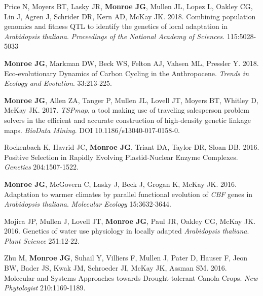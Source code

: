 \documentclass[12pt,english]{article}
\begin{document}
\begin{hangparas}{.5in}{1}
\vspace{1ex}\par
\hspace{1em}  Price N, Moyers BT, Lasky JR, \textbf{Monroe JG}, Mullen JL, Lopez L, Oakley CG, Lin J, Agren J, Schrider DR, Kern AD, McKay JK. 2018. Combining population genomics and fitness QTL to identify the genetics of local adaptation in \textit{Arabidopsis thaliana}. \textit{Proceedings of the National Academy of Sciences}. 115:5028-5033
\vspace{1ex}\par
\hspace{1em}  \textbf{Monroe JG}, Markman DW, Beck WS, Felton AJ, Vahsen ML, Pressler Y. 2018. Eco-evolutionary Dynamics of Carbon Cycling in the Anthropocene. \textit{Trends in Ecology and Evolution}. 33:213-225.
\vspace{1ex}\par
\hspace{1em}  \textbf{Monroe JG}, Allen ZA, Tanger P, Mullen JL, Lovell JT, Moyers BT, Whitley D, McKay JK. 2017. \textit{TSPmap}, a tool making use of traveling salesperson problem solvers in the efficient and accurate construction of high-density genetic linkage maps. \textit{BioData Mining}. DOI 10.1186/s13040-017-0158-0.
\vspace{1ex}\par
\hspace{1em} Rockenbach K, Havrid JC, \textbf{Monroe JG}, Triant DA, Taylor DR, Sloan DB. 2016. Positive Selection in Rapidly Evolving Plastid-Nuclear Enzyme Complexes. \textit{Genetics} 204:1507-1522.
\vspace{1ex}\par
\hspace{1em} \textbf{Monroe JG}, McGovern C, Lasky J, Beck J, Grogan K, McKay JK. 2016. Adaptation to warmer climates by parallel functional evolution of \textit{CBF} genes in \textit{Arabidopsis thaliana}. \textit{Molecular Ecology} 15:3632-3644.
\vspace{1ex}\par
\hspace{1em} Mojica JP, Mullen J, Lovell JT, \textbf{Monroe JG}, Paul JR, Oakley CG, McKay JK. 2016. Genetics of water use physiology in locally adapted \textit{Arabidopsis thaliana}. \textit{Plant Science}  251:12-22.
\vspace{1ex}\par
\hspace{1em} Zhu M, \textbf{Monroe JG}, Suhail Y, Villiers F, Mullen J, Pater D, Hauser F, Jeon BW, Bader JS, Kwak JM, Schroeder JI, McKay JK, Assman SM. 2016. Molecular and Systems Approaches towards Drought-tolerant Canola Crops. \textit{New Phytologist} 210:1169-1189.
\end{hangparas}
\vspace{1ex}
\end{document}
